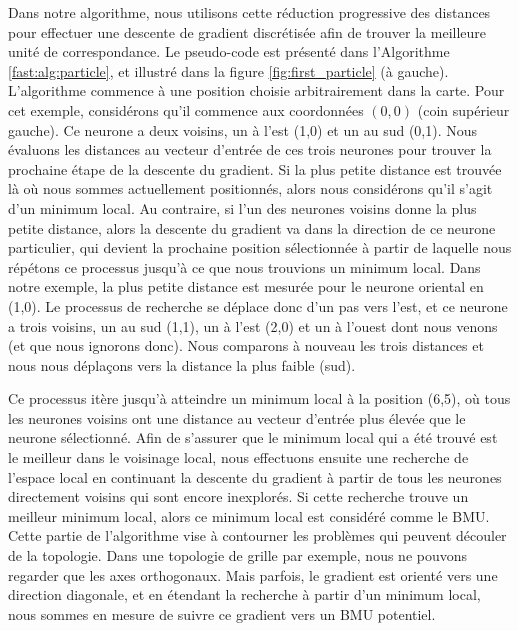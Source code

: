 	Dans notre algorithme, nous utilisons cette réduction progressive des distances pour effectuer une descente de gradient discrétisée afin de trouver la meilleure unité de correspondance. Le pseudo-code est présenté dans l'Algorithme \ref{fast:alg:particle}, et illustré dans la figure \ref{fig:first_particle} (à gauche). L'algorithme commence à une position choisie arbitrairement dans la carte. Pour cet exemple, considérons qu'il commence aux coordonnées $(0,0)$ (coin supérieur gauche). Ce neurone a deux voisins, un à l'est (1,0) et un au sud (0,1). Nous évaluons les distances au vecteur d'entrée de ces trois neurones pour trouver la prochaine étape de la descente du gradient. Si la plus petite distance est trouvée là où nous sommes actuellement positionnés, alors nous considérons qu'il s'agit d'un minimum local. Au contraire, si l'un des neurones voisins donne la plus petite distance, alors la descente du gradient va dans la direction de ce neurone particulier, qui devient la prochaine position sélectionnée à partir de laquelle nous répétons ce processus jusqu'à ce que nous trouvions un minimum local. Dans notre exemple, la plus petite distance est mesurée pour le neurone oriental en (1,0). Le processus de recherche se déplace donc d'un pas vers l'est, et ce neurone a trois voisins, un au sud (1,1), un à l'est (2,0) et un à l'ouest dont nous venons (et que nous ignorons donc). Nous comparons à nouveau les trois distances et nous nous déplaçons vers la distance la plus faible (sud).

	Ce processus itère jusqu'à atteindre un minimum local à la position (6,5), où tous les neurones voisins ont une distance au vecteur d'entrée plus élevée que le neurone sélectionné. Afin de s'assurer que le minimum local qui a été trouvé est le meilleur dans le voisinage local, nous effectuons ensuite une recherche de l'espace local en continuant la descente du gradient à partir de tous les neurones directement voisins qui sont encore inexplorés. Si cette recherche trouve un meilleur minimum local, alors ce minimum local est considéré comme le BMU. Cette partie de l'algorithme vise à contourner les problèmes qui peuvent découler de la topologie. Dans une topologie de grille par exemple, nous ne pouvons regarder que les axes orthogonaux. Mais parfois, le gradient est orienté vers une direction diagonale, et en étendant la recherche à partir d'un minimum local, nous sommes en mesure de suivre ce gradient vers un BMU potentiel.


